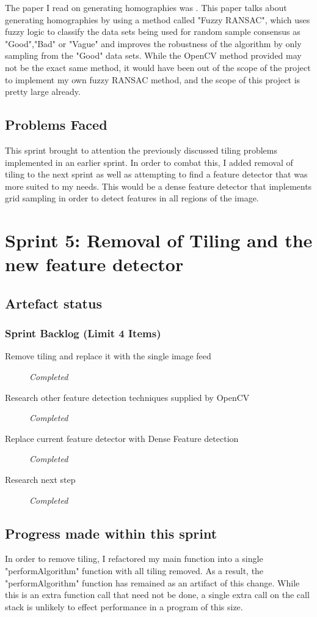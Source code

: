 The paper I read on generating homographies was \cite{fuzzyRANSAC}. This paper talks about generating homographies by using a method called "Fuzzy RANSAC", which uses fuzzy logic to classify the data sets being used for random sample consensus as "Good","Bad" or "Vague" and improves the robustness of the algorithm by only sampling from the "Good" data sets. While the OpenCV method provided may not be the exact same method, it would have been out of the scope of the project to implement my own fuzzy RANSAC method, and the scope of this project is pretty large already.

\subsection{Problems Faced}
This sprint brought to attention the previously discussed tiling problems implemented in an earlier sprint. In order to combat this, I added removal of tiling to the next sprint as well as attempting to find a feature detector that was more suited to my needs. This would be a dense feature detector that implements grid sampling in order to detect features in all regions of the image.
\clearpage
\section{Sprint 5: Removal of Tiling and the new feature detector}
\subsection{Artefact status}
\subsubsection{Sprint Backlog (Limit 4 Items)}
\begin{description}
  \item[Remove tiling and replace it with the single image feed] \em{Completed}
  \item[Research other feature detection techniques supplied by OpenCV] \em{Completed}
  \item[Replace current feature detector with Dense Feature detection] \em{Completed}
  \item[Research next step] \em{Completed}
\end{description}
\subsection{Progress made within this sprint}
In order to remove tiling, I refactored my main function into a single "performAlgorithm" function with all tiling removed. As a result, the "performAlgorithm" function has remained as an artifact of this change. While this is an extra function call that need not be done, a single extra call on the call stack is unlikely to effect performance in a program of this size.


